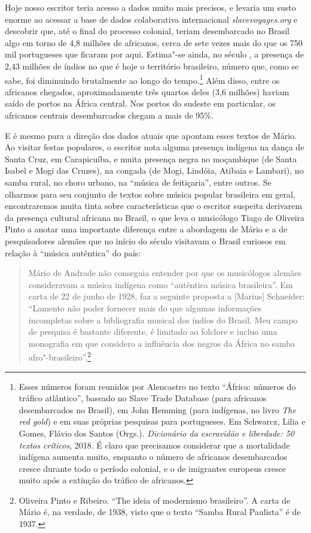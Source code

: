 Hoje nosso escritor teria acesso a dados muito mais precisos, e levaria
um susto enorme ao acessar a base de dados colaborativa internacional
\emph{slavevoyages.org} e descobrir que, até o final do processo
colonial, teriam desembarcado no Brasil algo em torno de 4,8 milhões de
africanos, cerca de sete vezes mais do que os 750 mil portugueses que
ficaram por aqui. Estima"-se ainda, no século , a presença de 2,43
milhões de índios no que é hoje o território brasileiro, número que,
como se sabe, foi diminuindo brutalmente ao longo do tempo.\footnote{Esses
  números foram reunidos por Alencastro no texto ``África: números do
  tráfico atlântico'', baseado no Slave Trade Database (para africanos
  desembarcados no Brasil), em John Hemming (para indígenas, no livro
  \emph{The red gold}) e em suas próprias pesquisas para portugueses. Em
  Schwarcz, Lilia e Gomes, Flávio dos Santos (Orgs.). \emph{Dicionário
  da escravidão e liberdade: 50 textos críticos}, 2018. É claro que
  precisamos considerar que a mortalidade indígena aumenta muito,
  enquanto o número de africanos desembarcados cresce durante todo o
  período colonial, e o de imigrantes europeus cresce muito após a
  extinção do tráfico de africanos.} Além disso, entre os africanos
chegados, aproximadamente três quartos deles (3,6 milhões) haviam saído
de portos na África central. Nos portos do sudeste em particular, os
africanos centrais desembarcados chegam a mais de 95\%.

E é mesmo para a direção dos dados atuais que apontam esses textos de
Mário. Ao visitar festas populares, o escritor nota alguma presença
indígena na dança de Santa Cruz, em Carapicuíba, e muita presença negra
no moçambique (de Santa Isabel e Mogi das Cruzes), na congada (de Mogi,
Lindóia, Atibaia e Lambari), no samba rural, no choro urbano, na
``música de feitiçaria'', entre outros. Se olharmos para seu conjunto de
textos sobre música popular brasileira em geral, encontraremos muita
tinta sobre características que o escritor suspeita derivarem da
presença cultural africana no Brasil, o que leva o musicólogo Tiago de
Oliveira Pinto a anotar uma importante diferença entre a abordagem de
Mário e a de pesquisadores alemães que no início do século  visitavam
o Brasil curiosos em relação à ``música autêntica'' do país:

\begin{quote}
Mário de Andrade não conseguia entender por que os musicólogos alemães
consideravam a música indígena como ``autêntica música brasileira''. Em
carta de 22 de junho de 1928, faz a seguinte proposta a {[}Marius{]}
Schneider: ``Lamento não poder fornecer mais do que algumas informações
incompletas sobre a bibliografia musical dos índios do Brasil. Meu campo
de pesquisa é bastante diferente, é limitado ao folclore e incluo uma
monografia em que considero a influência dos negros da África no samba
afro"-brasileiro''.\footnote{Oliveira Pinto e Ribeiro. ``The ideia of
  modernismo brasileiro''. A carta de Mário é, na verdade, de 1938,
  visto que o texto ``Samba Rural Paulista'' é de 1937.}
\end{quote}

